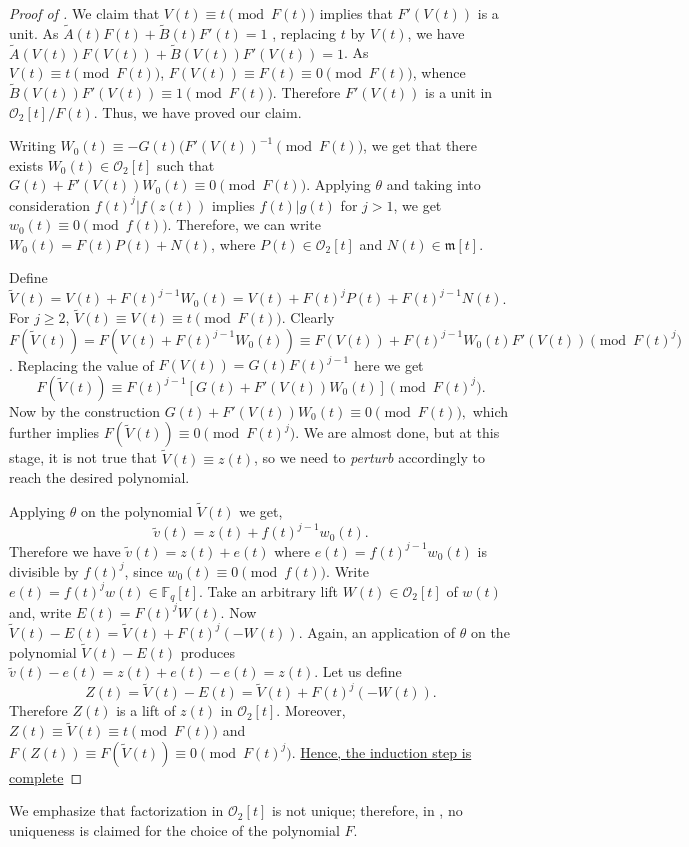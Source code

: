 \documentclass[11pt,twoside]{amsart}
\newcommand{\R}{\mathscr{O}_2}
\theoremstyle{definition} %
\begin{document}
\begin{proof}[Proof of ]
We claim that $V(t)\equiv t\pmod{F(t)}$ implies that $F'(V(t))$ is a unit.
As $\tilde{A}(t)F(t)+\tilde{B}(t)F'(t)=1$ , replacing $t$ by $V(t)$, we have $\tilde{A}(V(t))F(V(t))+\tilde{B}(V(t))F'(V(t))=1$. 
As $V(t)\equiv t\pmod{F(t)}$, $F(V(t))\equiv F(t)\equiv 0\pmod{F(t)}$, whence 
$\tilde{B}(V(t))F'(V(t))\equiv1\pmod{F(t)}$. Therefore $F'(V(t))$ is a unit in $\R[t]/F(t)$.
Thus, we have proved our claim.

Writing $W_0(t)\equiv -G(t)(F'(V(t))^{-1}\pmod{F(t)}$, we get that there exists $W_0(t)\in \mathscr{O}_2[t]$ such that $G(t)+F'(V(t))W_0(t)\equiv 0\pmod{F(t)}.$
Applying $\theta$ and taking into consideration $f(t)^j|f(z(t))$ implies $f(t)|g(t)$ for $j>1$, we get $w_0(t)\equiv 0\pmod{f(t)}$. 
Therefore, we can write $W_0(t)=F(t)P(t)+N(t)$, where $P(t)\in \R[t]$ and $N(t)\in \mathfrak{m}[t]$.

Define $\widetilde{V}(t)=V(t)+F(t)^{j-1}W_0(t)=V(t)+F(t)^jP(t)+F(t)^{j-1}N(t)$. For $j\geq 2$, $\widetilde{V}(t)\equiv V(t)\equiv t\pmod{F(t)}$. 
Clearly $F(\widetilde{V}(t))=F(V(t)+F(t)^{j-1}W_0(t))\equiv F(V(t))+F(t)^{j-1}W_0(t)F'(V(t))\pmod{F(t)^j}$.
Replacing the value of $F(V(t))=G(t)F(t)^{j-1}$ here we get $$F(\widetilde{V}(t))\equiv F(t)^{j-1}[G(t)+F'(V(t))W_0(t)]\pmod{F(t)^j}.$$
Now by the construction $G(t)+F'(V(t))W_0(t)\equiv 0\pmod{F(t)},$ which further implies $F(\widetilde{V}(t))\equiv 0\pmod{F(t)^j}.$
We are almost done, but at this stage, it is not true that $\widetilde{V}(t)\equiv z(t)$, so we need to \emph{perturb} accordingly to reach the desired polynomial.

Applying $\theta$ on the polynomial $\widetilde{V}(t)$ we get, $$\widetilde{v}(t)=z(t)+f(t)^{j-1}w_0(t).$$ 
Therefore we have $\widetilde{v}(t)=z(t)+e(t)$ where $e(t)=f(t)^{j-1}w_0(t)$ is divisible by $f(t)^j$, since $w_0(t)\equiv0\pmod{f(t)}.$
Write $e(t)=f(t)^jw(t)\in\mathbb{F}_q[t]$. Take an arbitrary lift $W(t)\in\R[t]$ of $w(t)$ and, write $E(t)=F(t)^j W(t)$.
Now $\widetilde{V}(t)-E(t)=\widetilde{V}(t)+F(t)^j(-W(t)).$
Again, an application of $\theta$ on the polynomial $\widetilde{V}(t)-E(t)$ produces $\tilde{v}(t)-e(t)=z(t)+e(t)-e(t)=z(t)$. Let us define 
$$ Z(t)=\widetilde{V}(t)-E(t)=\widetilde{V}(t)+F(t)^j(-W(t)).$$
Therefore $Z(t)$ is a lift of $z(t)$ in $\mathscr{O}_2[t]$. Moreover, $Z(t)\equiv \widetilde{V}(t)\equiv t\pmod{F(t)}$ and $F(Z(t))\equiv F(\widetilde{V}(t))\equiv 0\pmod{F(t)^j}$. 
\ul{Hence, the induction step is complete}
\end{proof}
We emphasize that factorization in $\R[t]$ is not unique; therefore, in , no uniqueness is claimed for the choice of the polynomial $F$.
\end{document}
